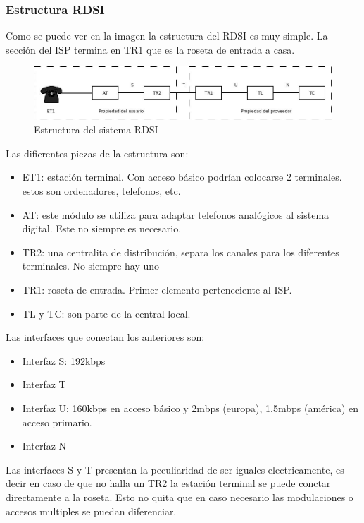 \subsubsection{Estructura \acrshort{RDSI}}
Como se puede ver en la imagen la estructura del \acrshort{RDSI} es muy simple. La sección del \acrshort{ISP} termina en TR1 que es la roseta de entrada a casa.
\begin{figure}[htp]
	\centering
	\includegraphics[width=\textwidth]{Imagen/diaRDSI.jpg}
	\caption{Estructura del sistema \acrshort{RDSI}}
	\label{}
\end{figure}
Las difierentes piezas de la estructura son:
\begin{itemize}
	\item ET1: estación terminal. Con acceso básico podrían colocarse 2 terminales. estos son ordenadores, telefonos, etc.
	\item AT: este módulo se utiliza para adaptar telefonos analógicos al sistema digital. Este no siempre es necesario.
	\item TR2: una centralita de distribución, separa los canales para los diferentes terminales. No siempre hay uno
	\item TR1: roseta de entrada. Primer elemento perteneciente al ISP.
	\item TL y TC: son parte de la central local.
\end{itemize}
Las interfaces que conectan los anteriores son:
\begin{itemize}
	\item Interfaz S: 192kbps
	\item Interfaz T
	\item Interfaz U: 160kbps en acceso básico y 2mbps (europa), 1.5mbps (américa) en acceso primario.
	\item Interfaz N
\end{itemize}
Las interfaces S y T presentan la peculiaridad de ser iguales electricamente, es decir en caso de que no halla un TR2 la estación terminal se puede conctar directamente a la roseta. Esto no quita que en caso necesario las modulaciones o accesos multiples se puedan diferenciar.\\
